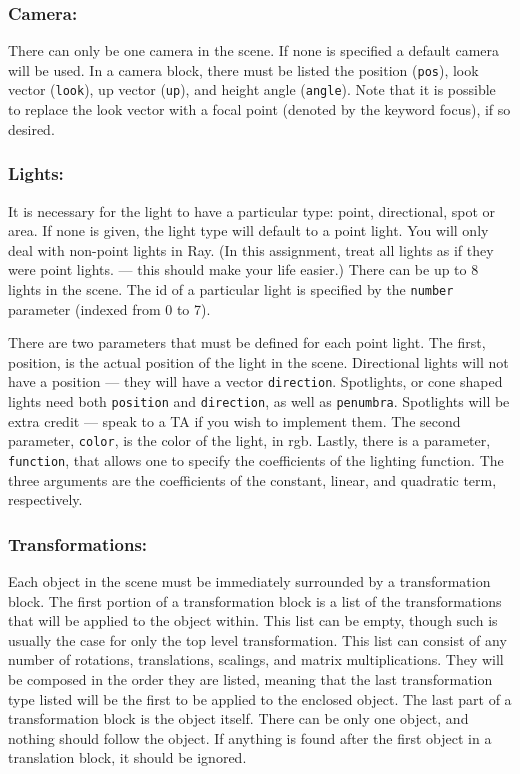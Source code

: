 \documentclass{scrartcl}
\begin{document}
\subsubsection*{Camera:}
There can only be one camera in the scene. If none is specified a default camera will be used. In a camera
block, there must be listed the position (\texttt{pos}), look vector (\texttt{look}), up vector (\texttt{up}), and height angle (\texttt{angle}).
Note that it is possible to replace the look vector with a focal point (denoted by the keyword focus), if so
desired.
\subsubsection*{Lights:}
It is necessary for the light to have a particular type: point, directional, spot or area. If none is given, the
light type will default to a point light. You will only deal with non-point lights in Ray. (In this assignment,
treat all lights as if they were point lights. --- this should make your life easier.) There can be up to 8 lights
in the scene. The id of a particular light is specified by the \texttt{number} parameter (indexed from 0 to 7).

There are two parameters that must be defined for each point light. The first, position, is the actual
position of the light in the scene. Directional lights will not have a position --- they will have a vector
\texttt{direction}. Spotlights, or cone shaped lights need both \texttt{position} and \texttt{direction}, as well as \texttt{penumbra}.
Spotlights will be extra credit --- speak to a TA if you wish to implement them. The second parameter,
\texttt{color}, is the color of the light, in rgb. Lastly, there is a parameter, \texttt{function}, that allows one to specify
the coefficients of the lighting function. The three arguments are the coefficients of the constant, linear, and
quadratic term, respectively.
\subsubsection*{Transformations:}
Each object in the scene must be immediately surrounded by a transformation block. The first portion
of a transformation block is a list of the transformations that will be applied to the object within. This list
can be empty, though such is usually the case for only the top level transformation. This list can consist of
any number of rotations, translations, scalings, and matrix multiplications. They will be composed in the
order they are listed, meaning that the last transformation type listed will be the first to be applied to the
enclosed object. The last part of a transformation block is the object itself. There can be only one object,
and nothing should follow the object. If anything is found after the first object in a translation block, it
should be ignored.
\end{document}
